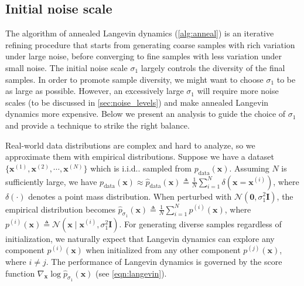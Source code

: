 \documentclass{article}
\makeatletter
\newcommand{\mcal}{\mathcal}
\def\@onedot{\ifx\@let@token.\else.\null\fi\xspace}
\DeclareRobustCommand\onedot{\futurelet\@let@token\@onedot}
\newcommand{\bfx}{\mathbf{x}}
\newcommand{\bfI}{\mathbf{I}}
\newcommand{\bfzero}{\mathbf{0}}
\def\iid{i.i.d\onedot}
\makeatother
\begin{document}
\subsection{Initial noise scale}
The algorithm of annealed Langevin dynamics (\cref{alg:anneal}) is an iterative refining procedure that starts from generating coarse samples with rich variation under large noise, before converging to fine samples with less variation under small noise. The initial noise scale $\sigma_1$ largely controls the diversity of the final samples. 
In order to promote sample diversity, we might want to choose $\sigma_1$ to be as large as possible. However, an excessively large $\sigma_1$ will require more noise scales (to be discussed in \cref{sec:noise_levels}) and make annealed Langevin dynamics more expensive. Below we present an analysis to guide the choice of $\sigma_1$ and provide a technique to strike the right balance.



Real-world data distributions are complex and hard to analyze, so we approximate them with empirical distributions. Suppose we have a dataset $\{\bfx^{(1)}, \bfx^{(2)}, \cdots, \bfx^{(N)}\}$ which is \iid sampled from $p_\text{data}(\bfx)$. Assuming $N$ is sufficiently large, we have $p_\text{data}(\bfx) \approx \hat{p}_{\text{data}}(\bfx) \triangleq \frac{1}{N}\sum_{i=1}^N \delta(\bfx = \bfx^{(i)})$, where $\delta(\cdot)$ denotes a point mass distribution. When perturbed with $\mcal{N}(\bfzero, \sigma_1^2 \bfI)$, the empirical distribution becomes $\hat{p}_{\sigma_1}(\bfx) \triangleq \frac{1}{N} \sum_{i=1}^N p^{(i)}(\bfx)$, where $p^{(i)}(\bfx) \triangleq \mcal{N}(\bfx \mid \bfx^{(i)}, \sigma_1^2 \bfI)$. For generating diverse samples regardless of initialization, we naturally expect that Langevin dynamics can explore any component $p^{(i)}(\bfx)$ when initialized from any other component $p^{(j)}(\bfx)$, where $i \neq j$. The performance of Langevin dynamics is governed by the score function $\nabla_\bfx \log \hat{p}_{\sigma_1}(\bfx)$ (see \cref{eqn:langevin}).
\end{document}
